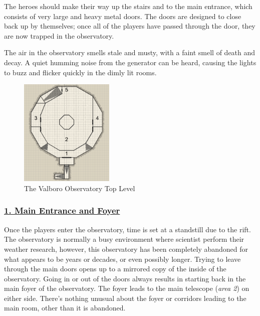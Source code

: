 \documentclass{article}
\begin{document}
\begin{multicols*}{2}
		The heroes should make their way up the stairs and to the main entrance, which consists of very large and heavy metal doors. The doors are designed to close back up by themselves; once all of the players have passed through the door, they are now trapped in the observatory. 
		
		The air in the observatory smells stale and musty, with a faint smell of death and decay. A quiet humming noise from the generator can be heard, causing the lights to buzz and flicker quickly in the dimly lit rooms.
		
		\begin{figure}
			\centering
			\includegraphics[width=0.4\textwidth]{images/observatory}
			\caption{The Valboro Observatory Top Level}
		\end{figure}
	
		\subsubsection*{\underline{1. Main Entrance and Foyer}}
	
		Once the players enter the observatory, time is set at a standstill due to the rift. The observatory is normally a busy environment where scientist perform their weather research, however, this observatory has been completely abandoned for what appears to be years or decades, or even possibly longer. Trying to leave through the main doors opens up to a mirrored copy of the inside of the observatory. Going in or out of the doors always results in starting back in the main foyer of the observatory. The foyer leads to the main telescope (\emph{area 2}) on either side. There's nothing unusual about the foyer or corridors leading to the main room, other than it is abandoned. 
		

\end{multicols*}
\end{document}
